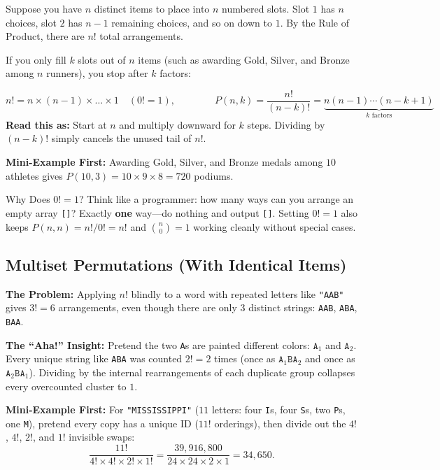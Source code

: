 \documentclass[11pt,a4paper]{article}
\theoremstyle{definition}
\newcommand{\painbeat}{\textbf{\color{accentamber}The Problem:} }
\newcommand{\ahabeat}{\textbf{\color{accentteal}The ``Aha!'' Insight:} }
\newcommand{\examplebeat}{\textbf{\color{primaryblue}Mini-Example First:} }
\begin{document}
Suppose you have $n$ distinct items to place into $n$ numbered slots. Slot $1$ has $n$ choices, slot $2$ has $n - 1$ remaining choices, and so on down to $1$. By the Rule of Product, there are $n!$ total arrangements.

If you only fill $k$ slots out of $n$ items (such as awarding Gold, Silver, and Bronze among $n$ runners), you stop after $k$ factors:

\begin{formulabox}
\[
    n! = n \times (n-1) \times \dots \times 1 \quad (0! = 1),
    \qquad\qquad
    P(n, k) = \frac{n!}{(n-k)!} = \underbrace{n (n-1) \cdots (n-k+1)}_{k \text{ factors}}
\]
\textbf{Read this as:} Start at $n$ and multiply downward for $k$ steps. Dividing by $(n-k)!$ simply cancels the unused tail of $n!$.
\end{formulabox}

\examplebeat Awarding Gold, Silver, and Bronze medals among $10$ athletes gives $P(10, 3) = 10 \times 9 \times 8 = 720$ podiums.

\begin{calloutbox}{Why Does $0! = 1$?}
Think like a programmer: how many ways can you arrange an empty array \texttt{[]}? Exactly \textbf{one} way---do nothing and output \texttt{[]}. Setting $0! = 1$ also keeps $P(n, n) = n! / 0! = n!$ and $\binom{n}{0} = 1$ working cleanly without special cases.
\end{calloutbox}

\subsection{Multiset Permutations (With Identical Items)}

\painbeat Applying $n!$ blindly to a word with repeated letters like \texttt{"AAB"} gives $3! = 6$ arrangements, even though there are only $3$ distinct strings: \texttt{AAB}, \texttt{ABA}, \texttt{BAA}.

\ahabeat Pretend the two \texttt{A}s are painted different colors: $\texttt{A}_1$ and $\texttt{A}_2$. Every unique string like \texttt{ABA} was counted $2! = 2$ times (once as $\texttt{A}_1\texttt{B}\texttt{A}_2$ and once as $\texttt{A}_2\texttt{B}\texttt{A}_1$). Dividing by the internal rearrangements of each duplicate group collapses every overcounted cluster to $1$.

\examplebeat For \texttt{"MISSISSIPPI"} ($11$ letters: four \texttt{I}s, four \texttt{S}s, two \texttt{P}s, one \texttt{M}), pretend every copy has a unique ID ($11!$ orderings), then divide out the $4!$, $4!$, $2!$, and $1!$ invisible swaps:
\[
    \frac{11!}{4! \times 4! \times 2! \times 1!} = \frac{39{,}916{,}800}{24 \times 24 \times 2 \times 1} = 34{,}650.
\]
\end{document}
